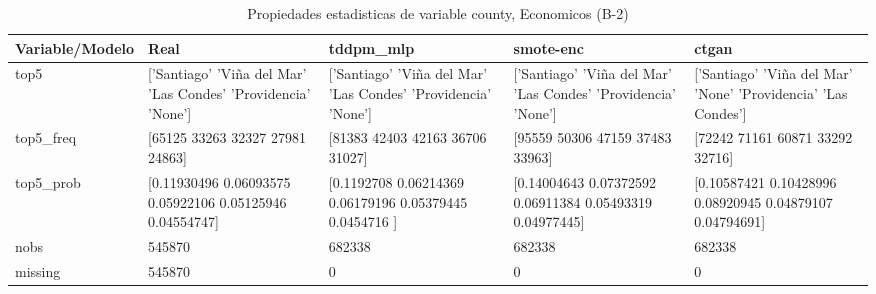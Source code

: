 \begin{table}[H]
\centering
\fontsize{8}{14}\selectfont
\caption{Propiedades  estadisticas de variable county, Economicos (B-2)}
\label{table-stats-economicos-b-2-county}
\begin{tabular}{|l|m{10em}|m{10em}|m{10em}|m{10em}|}
\hline
 \rowcolor[gray]{0.8}
Variable/Modelo & Real & tddpm\_mlp & smote-enc & ctgan \\
\hline top5 & ['Santiago' 'Viña del Mar' 'Las Condes' 'Providencia' 'None'] & ['Santiago' 'Viña del Mar' 'Las Condes' 'Providencia' 'None'] & ['Santiago' 'Viña del Mar' 'Las Condes' 'Providencia' 'None'] & ['Santiago' 'Viña del Mar' 'None' 'Providencia' 'Las Condes'] \\
\hline top5\_freq & [65125 33263 32327 27981 24863] & [81383 42403 42163 36706 31027] & [95559 50306 47159 37483 33963] & [72242 71161 60871 33292 32716] \\
\hline top5\_prob & [0.11930496 0.06093575 0.05922106 0.05125946 0.04554747] & [0.1192708  0.06214369 0.06179196 0.05379445 0.0454716 ] & [0.14004643 0.07372592 0.06911384 0.05493319 0.04977445] & [0.10587421 0.10428996 0.08920945 0.04879107 0.04794691] \\
\hline nobs & 545870 & 682338 & 682338 & 682338 \\
\hline missing & 545870 & 0 & 0 & 0 \\
\hline
\end{tabular}
\end{table}
